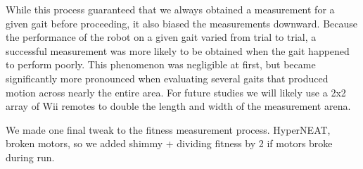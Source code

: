 While this process guaranteed that we always obtained a measurement
for a given gait before proceeding, it also biased the measurements
downward.  Because the performance of the robot on a given gait varied
from trial to trial, a successful measurement was more likely to be
obtained when the gait happened to perform poorly.  This phenomenon
was negligible at first, but became significantly more pronounced when
evaluating several gaits that produced motion across nearly the entire
area.  For future studies we will likely use a 2x2 array of Wii
remotes to double the length and width of the measurement arena.




We made one final tweak to the fitness measurement process.
HyperNEAT, broken motors, so we added shimmy + dividing fitness by 2
if motors broke during run.

